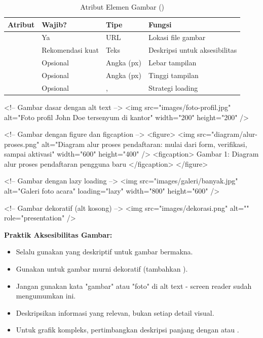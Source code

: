\begin{table}[htbp]
\centering
\begin{tabular}{|P{2.5cm}|P{2.5cm}|P{3cm}|P{4cm}|}
\hline
\textbf{Atribut} & \textbf{Wajib?} & \textbf{Tipe} & \textbf{Fungsi} \\
\hline
{} & Ya & URL & Lokasi file gambar \\
\hline
{} & Rekomendasi kuat & Teks & Deskripsi untuk aksesibilitas \\
\hline
{} & Opsional & Angka (px) & Lebar tampilan \\
\hline
{} & Opsional & Angka (px) & Tinggi tampilan \\
\hline
{} & Opsional & ,  & Strategi loading \\
\hline
\end{tabular}
\caption{Atribut Elemen Gambar ()}
\label{tab:img-attributes}
\end{table}

\begin{webcode}[language=HTML, caption={Contoh Penggunaan Gambar}]
<!-- Gambar dasar dengan alt text -->
<img src="images/foto-profil.jpg" 
     alt="Foto profil John Doe tersenyum di kantor" 
     width="200" height="200" />

<!-- Gambar dengan figure dan figcaption -->
<figure>
  <img src="diagram/alur-proses.png" 
       alt="Diagram alur proses pendaftaran: 
            mulai dari form, verifikasi, sampai aktivasi" 
       width="600" height="400" />
  <figcaption>
    Gambar 1: Diagram alur proses pendaftaran pengguna baru
  </figcaption>
</figure>

<!-- Gambar dengan lazy loading -->
<img src="images/galeri/banyak.jpg" 
     alt="Galeri foto acara" 
     loading="lazy" 
     width="800" height="600" />

<!-- Gambar dekoratif (alt kosong) -->
<img src="images/dekorasi.png" 
     alt="" 
     role="presentation" />
\end{webcode}

\begin{catatan}
\textbf{Praktik Aksesibilitas Gambar:}
\begin{itemize}[leftmargin=*]
  \item Selalu gunakan  yang deskriptif untuk gambar bermakna.
  \item Gunakan  untuk gambar murni dekoratif (tambahkan ).
  \item Jangan gunakan kata "gambar" atau "foto" di alt text - screen reader sudah mengumumkan ini.
  \item Deskripsikan informasi yang relevan, bukan setiap detail visual.
  \item Untuk grafik kompleks, pertimbangkan deskripsi panjang dengan  atau .
\end{itemize}
\end{catatan}

